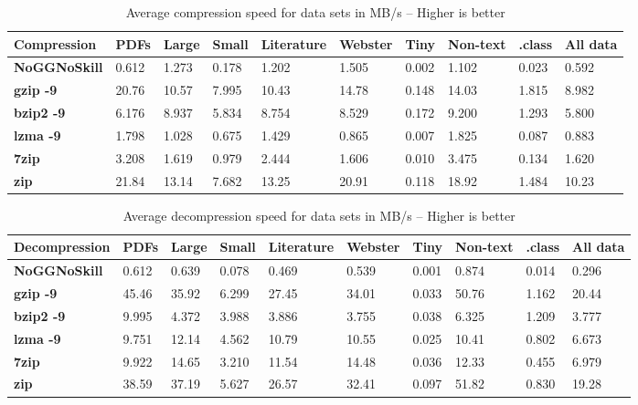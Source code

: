 \documentclass[a4paper]{article}
\begin{document}
\begin{table}[!h]
\centering
\begin{tabular}{| l | l | l | l | l | l | l | l | l | l |}
\hline
\textbf{Compression} & \textbf{PDFs} & \textbf{Large} & \textbf{Small} & \textbf{Literature} & \textbf{Webster} & \textbf{Tiny} & \textbf{Non-text} & \textbf{.class} & \textbf{All data} \\
\hline
\textbf{NoGGNoSkill} & 0.612 & 1.273 & 0.178 & 1.202 & 1.505 & 0.002 & 1.102 & 0.023 & 0.592 \\
\hline
\textbf{gzip -9} & 20.76 & 10.57 & 7.995 & 10.43 & 14.78 & 0.148 & 14.03 & 1.815 & 8.982 \\
\hline
\textbf{bzip2 -9} & 6.176 & 8.937 & 5.834 & 8.754 & 8.529 & 0.172 & 9.200 & 1.293 & 5.800 \\
\hline
\textbf{lzma -9} & 1.798 & 1.028 & 0.675 & 1.429 & 0.865 & 0.007 & 1.825 & 0.087 & 0.883 \\
\hline
\textbf{7zip} & 3.208 & 1.619 & 0.979 & 2.444 & 1.606 & 0.010 & 3.475 & 0.134 & 1.620 \\
\hline
\textbf{zip} & 21.84 & 13.14 & 7.682 & 13.25 & 20.91 & 0.118 & 18.92 & 1.484 & 10.23 \\
\hline
\end{tabular}
\caption{Average compression speed for data sets in MB/s -- Higher is better}
\label{tb:average_compression}
\end{table}

\begin{table}[!h]
\centering
\begin{tabular}{| l | l | l | l | l | l | l | l | l | l |}
\hline
\textbf{Decompression} & \textbf{PDFs} & \textbf{Large} & \textbf{Small} & \textbf{Literature} & \textbf{Webster} & \textbf{Tiny} & \textbf{Non-text} & \textbf{.class} & \textbf{All data} \\
\hline
\textbf{NoGGNoSkill} & 0.612 & 0.639 & 0.078 & 0.469 & 0.539 & 0.001 & 0.874 & 0.014 & 0.296 \\
\hline
\textbf{gzip -9} & 45.46 & 35.92 & 6.299 & 27.45 & 34.01 & 0.033 & 50.76 & 1.162 & 20.44 \\
\hline
\textbf{bzip2 -9} & 9.995 & 4.372 & 3.988 & 3.886 & 3.755 & 0.038 & 6.325 & 1.209 & 3.777 \\
\hline
\textbf{lzma -9} & 9.751 & 12.14 & 4.562 & 10.79 & 10.55 & 0.025 & 10.41 & 0.802 & 6.673 \\
\hline
\textbf{7zip} & 9.922 & 14.65 & 3.210 & 11.54 & 14.48 & 0.036 & 12.33 & 0.455 & 6.979 \\
\hline
\textbf{zip} & 38.59 & 37.19 & 5.627 & 26.57 & 32.41 & 0.097 & 51.82 & 0.830 & 19.28 \\
\hline
\end{tabular}
\caption{Average decompression speed for data sets in MB/s -- Higher is better}
\label{tb:average_decompression}
\end{table}
\FloatBarrier


\end{document}
